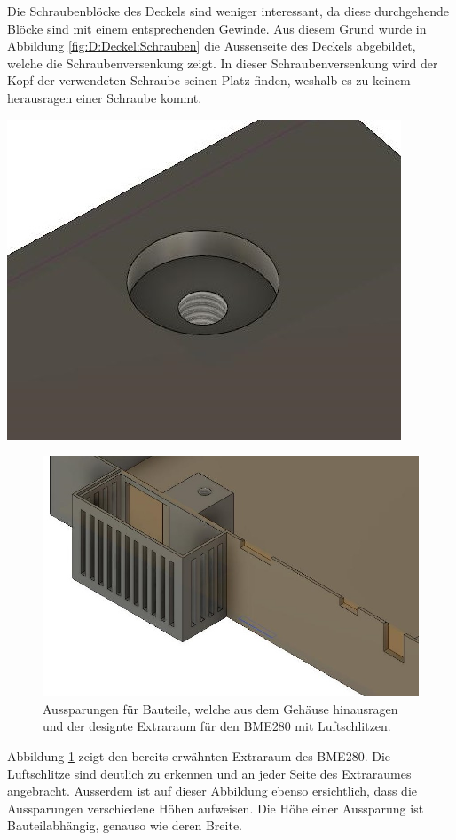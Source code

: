 {\begin{minipage}[b][9cm][t]{0.39\textwidth}
Die Schraubenblöcke des Deckels sind weniger interessant, da diese durchgehende Blöcke sind mit einem entsprechenden Gewinde. Aus diesem Grund wurde in Abbildung \ref{fig:D:Deckel:Schrauben} die Aussenseite des Deckels abgebildet, welche die Schraubenversenkung zeigt. In dieser Schraubenversenkung wird der Kopf der verwendeten Schraube seinen Platz finden, weshalb es zu keinem herausragen einer Schraube kommt.
\end{minipage}}
{\begin{minipage}[b][9cm][t]{0.6\textwidth}
\centering
\includegraphics[width=0.8\linewidth]{graphics/Gehaeuse/Design_Deckel_Schraubenversenkung.jpg}
\label{fig:D:Deckel:Schrauben}
\end{minipage}

\begin{figure}[h]
\centering
\includegraphics[width=0.6\linewidth]{graphics/Gehaeuse/Design_Deckel_BMEundAussparungen.jpg}
\caption{Aussparungen für Bauteile, welche aus dem Gehäuse hinausragen und der designte Extraraum für den BME280 mit Luftschlitzen.}
\label{fig:D:Deckel:BME}
\end{figure}
Abbildung \ref{fig:D:Deckel:BME} zeigt den bereits erwähnten Extraraum des BME280. Die Luftschlitze sind deutlich zu erkennen und an jeder Seite des Extraraumes angebracht. Ausserdem ist auf dieser Abbildung ebenso ersichtlich, dass die Aussparungen verschiedene Höhen aufweisen. Die Höhe einer Aussparung ist Bauteilabhängig, genauso wie deren Breite.

}
